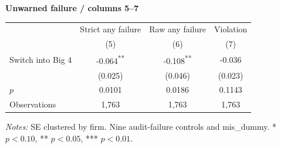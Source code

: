 \documentclass[10pt]{article}
\newcommand{\sym}[1]{\textsuperscript{#1}}
\begin{document}
\medskip\textbf{Unwarned failure / columns 5--7}\par\smallskip
\begin{tabular*}{\textwidth}{@{\extracolsep{\fill}}lccc@{}}
\toprule
 & Strict any failure & Raw any failure & Violation \\
 & (5) & (6) & (7) \\
\midrule
Switch into Big 4 & -0.064\sym{**} & -0.108\sym{**} & -0.036 \\
 & (0.025) & (0.046) & (0.023) \\
$p$ & 0.0101 & 0.0186 & 0.1143 \\
Observations & 1,763 & 1,763 & 1,763 \\
\bottomrule\end{tabular*}\par
\medskip\fontsize{9}{11}\selectfont\textit{Notes:} SE clustered by firm. Nine audit-failure controls and mis\_dummy. * $p<0.10$, ** $p<0.05$, *** $p<0.01$.
\end{document}
